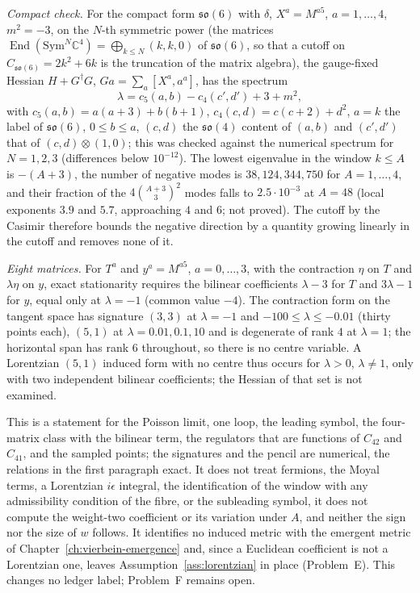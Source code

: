 \emph{Compact check.} For the compact form \(\mathfrak{so}(6)\) with \(\delta\), \(X^a=M^{a5}\), \(a=1,\dots,4\), \(m^2=-3\), on the \(N\)-th symmetric power (the matrices \(\operatorname{End}(\mathrm{Sym}^N\mathbb C^4)=\bigoplus_{k\le N}(k,k,0)\) of \(\mathfrak{so}(6)\), so that a cutoff on \(C_{\mathfrak{so}(6)}=2k^2+6k\) is the truncation of the matrix algebra), the gauge-fixed Hessian \(H+G^\dagger G\), \(Ga=\sum_a[X^a,a^a]\), has the spectrum
\[
\lambda=c_5(a,b)-c_4(c',d')+3+m^2,
\]
with \(c_5(a,b)=a(a+3)+b(b+1)\), \(c_4(c,d)=c(c+2)+d^2\), \(a=k\) the label of \(\mathfrak{so}(6)\), \(0\le b\le a\), \((c,d)\) the \(\mathfrak{so}(4)\) content of \((a,b)\) and \((c',d')\) that of \((c,d)\otimes(1,0)\); this was checked against the numerical spectrum for \(N=1,2,3\) (differences below \(10^{-12}\)). The lowest eigenvalue in the window \(k\le A\) is \(-(A+3)\), the number of negative modes is \(38,124,344,750\) for \(A=1,\dots,4\), and their fraction of the \(4\binom{A+3}{3}^2\) modes falls to \(2.5\cdot10^{-3}\) at \(A=48\) (local exponents \(3.9\) and \(5.7\), approaching \(4\) and \(6\); not proved). The cutoff by the Casimir therefore bounds the negative direction by a quantity growing linearly in the cutoff and removes none of it.

\emph{Eight matrices.} For \(T^a\) and \(y^a=M^{a5}\), \(a=0,\dots,3\), with the contraction \(\eta\) on \(T\) and \(\lambda\eta\) on \(y\), exact stationarity requires the bilinear coefficients \(\lambda-3\) for \(T\) and \(3\lambda-1\) for \(y\), equal only at \(\lambda=-1\) (common value \(-4\)). The contraction form on the tangent space has signature \((3,3)\) at \(\lambda=-1\) and \(-100\le\lambda\le-0.01\) (thirty points each), \((5,1)\) at \(\lambda=0.01,0.1,10\) and is degenerate of rank \(4\) at \(\lambda=1\); the horizontal span has rank \(6\) throughout, so there is no centre variable. A Lorentzian \((5,1)\) induced form with no centre thus occurs for \(\lambda>0\), \(\lambda\ne1\), only with two independent bilinear coefficients; the Hessian of that set is not examined.

This is a statement for the Poisson limit, one loop, the leading symbol, the four-matrix class with the bilinear term, the regulators that are functions of \(C_{42}\) and \(C_{41}\), and the sampled points; the signatures and the pencil are numerical, the relations in the first paragraph exact. It does not treat fermions, the Moyal terms, a Lorentzian \(i\epsilon\) integral, the identification of the window with any admissibility condition of the fibre, or the subleading symbol, it does not compute the weight-two coefficient or its variation under \(A\), and neither the sign nor the size of \(w\) follows. It identifies no induced metric with the emergent metric of Chapter~\ref{ch:vierbein-emergence} and, since a Euclidean coefficient is not a Lorentzian one, leaves Assumption~\ref{ass:lorentzian} in place (Problem~E). This changes no ledger label; Problem~F remains open.
